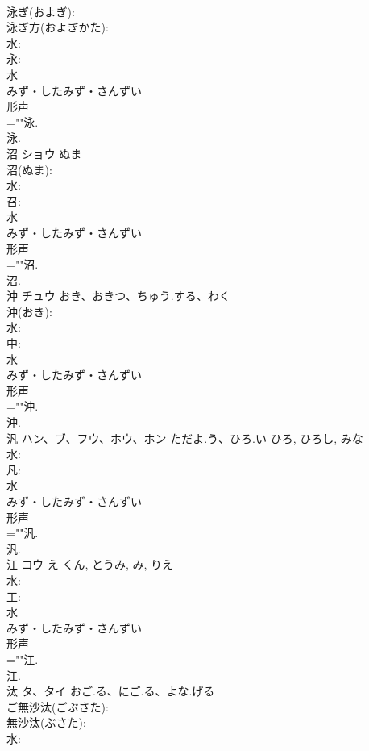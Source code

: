 \documentclass[8pt]{extreport}
\begin{document}
\begin{CJK}{UTF8}{min}
\\	泳ぎ(およぎ): 
\\	泳ぎ方(およぎかた): 
\\	水: 
\\	永: 
\\	水	
\\	みず・したみず・さんずい	
\\	形声 
\\	=""泳.
\\	泳.
\\	沼	ショウ	ぬま		
\\	沼(ぬま): 
\\	水: 
\\	召: 
\\	水	
\\	みず・したみず・さんずい	
\\	形声 
\\	=""沼.
\\	沼.
\\	沖	チュウ	おき、おきつ、ちゅう.する、わく		
\\	沖(おき): 
\\	水: 
\\	中: 
\\	水	
\\	みず・したみず・さんずい	
\\	形声 
\\	=""沖.
\\	沖.
\\	汎	ハン、ブ、フウ、ホウ、ホン	ただよ.う、ひろ.い	ひろ, ひろし, みな	
\\	水: 
\\	凡: 
\\	水	
\\	みず・したみず・さんずい	
\\	形声 
\\	=""汎.
\\	汎.
\\	江	コウ	え	くん, とうみ, み, りえ	
\\	水: 
\\	工: 
\\	水	
\\	みず・したみず・さんずい	
\\	形声 
\\	=""江.
\\	江.
\\	汰	タ、タイ	おご.る、にご.る、よな.げる		
\\	ご無沙汰(ごぶさた): 
\\	無沙汰(ぶさた): 
\\	水: 

\end{CJK}
\end{document}
